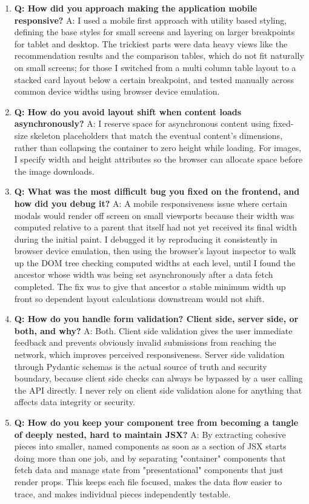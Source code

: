 \documentclass[11pt,a4paper]{report}
\begin{document}
\begin{enumerate}[leftmargin=*]
\item \textbf{Q: How did you approach making the application mobile responsive?}
A: I used a mobile first approach with utility based styling, defining the base styles for small screens and layering on larger breakpoints for tablet and desktop. The trickiest parts were data heavy views like the recommendation results and the comparison tables, which do not fit naturally on small screens; for those I switched from a multi column table layout to a stacked card layout below a certain breakpoint, and tested manually across common device widths using browser device emulation.

\item \textbf{Q: How do you avoid layout shift when content loads asynchronously?}
A: I reserve space for asynchronous content using fixed-size skeleton placeholders that match the eventual content's dimensions, rather than collapsing the container to zero height while loading. For images, I specify width and height attributes so the browser can allocate space before the image downloads.

\item \textbf{Q: What was the most difficult bug you fixed on the frontend, and how did you debug it?}
A: A mobile responsiveness issue where certain modals would render off screen on small viewports because their width was computed relative to a parent that itself had not yet received its final width during the initial paint. I debugged it by reproducing it consistently in browser device emulation, then using the browser's layout inspector to walk up the DOM tree checking computed widths at each level, until I found the ancestor whose width was being set asynchronously after a data fetch completed. The fix was to give that ancestor a stable minimum width up front so dependent layout calculations downstream would not shift.

\item \textbf{Q: How do you handle form validation? Client side, server side, or both, and why?}
A: Both. Client side validation gives the user immediate feedback and prevents obviously invalid submissions from reaching the network, which improves perceived responsiveness. Server side validation through Pydantic schemas is the actual source of truth and security boundary, because client side checks can always be bypassed by a user calling the API directly. I never rely on client side validation alone for anything that affects data integrity or security.

\item \textbf{Q: How do you keep your component tree from becoming a tangle of deeply nested, hard to maintain JSX?}
A: By extracting cohesive pieces into smaller, named components as soon as a section of JSX starts doing more than one job, and by separating "container" components that fetch data and manage state from "presentational" components that just render props. This keeps each file focused, makes the data flow easier to trace, and makes individual pieces independently testable.


\end{enumerate}
\end{document}
